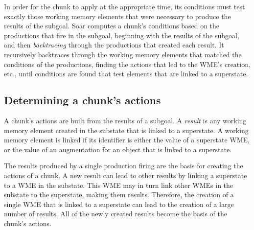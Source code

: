 In order for the chunk to apply at the appropriate time, its conditions must
test exactly those working memory elements that were necessary to produce the
results of the subgoal. Soar computes a chunk's conditions based on the
productions that fire in the subgoal, beginning with the results of the subgoal,
and then \emph{backtracing} through the productions that created each result. 
It recursively backtraces through the working memory elements that matched the
conditions of the productions, finding the actions that led to the WME's
creation, etc., until conditions are found that test elements that are linked to
a superstate. 



\subsection{Determining a chunk's actions}

A chunk's actions are built from the results of a subgoal.  A \emph{result} is
any working memory element created in the substate that is linked to a 
superstate.  A working memory element
is linked if its identifier is either the value of a superstate
WME, or the value of an augmentation  for an object that is linked to a
superstate.


The results produced by a single production firing are the basis for creating
the actions of a chunk. A new result can lead to other results by linking a
superstate to a WME in the substate. This WME may in turn link
other WMEs in the substate to the superstate, making them results.
Therefore, the creation of a single WME that is linked to a superstate
can lead to the creation of a large number of results. All of the newly
created results become the basis of the chunk's actions.

